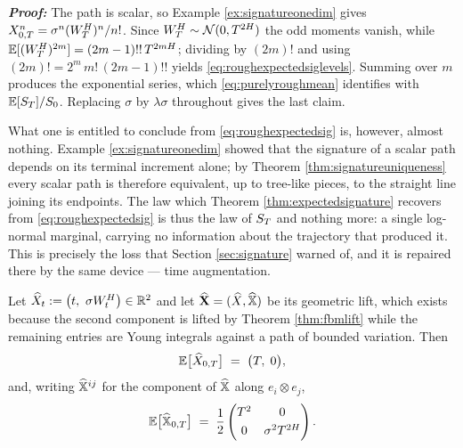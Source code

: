 \textbf{\textit{Proof:}} The path is scalar, so Example \ref{ex:signatureonedim} gives
$X^n_{0,T} = \sigma^n(W^{H}_T)^n/n!$. Since $W^{H}_T\sim\mathcal{N}(0,T^{2H})$ the odd
moments vanish, while $\mathbb{E}[(W^{H}_T)^{2m}] = (2m-1)!!\,T^{2mH}$; dividing by $(2m)!$ and
using $(2m)! = 2^m\,m!\,(2m-1)!!$ yields \eqref{eq:roughexpectedsiglevels}. Summing over $m$ produces
the exponential series, which \eqref{eq:purelyroughmean} identifies with
$\mathbb{E}[S_T]/S_0$. Replacing $\sigma$ by $\lambda\sigma$ throughout gives the last claim.
\qedfilledtext

\medskip

What one is entitled to conclude from \eqref{eq:roughexpectedsig} is, however, almost nothing. Example \ref{ex:signatureonedim} showed that the signature of a scalar
path depends on its terminal increment alone; by Theorem \ref{thm:signatureuniqueness} every scalar
path is therefore equivalent, up to tree-like pieces, to the straight line joining its endpoints. The
law which Theorem \ref{thm:expectedsignature} recovers from \eqref{eq:roughexpectedsig} is thus the
law of $S_T$ and nothing more: a single log-normal marginal, carrying no information about the
trajectory that produced it. This is precisely the loss that Section \ref{sec:signature} warned of,
and it is repaired there by the same device --- time augmentation.

\begin{proposition}\label{prop:roughexpectedsigaug}
Let $\widehat{X}_t := \bigl(t,\ \sigma W^{H}_t\bigr) \in \mathbb{R}^2$ and let
$\widehat{\mathbf{X}} = (\widehat X,\widehat{\mathbb{X}})$ be its geometric lift, which exists because the second
component is lifted by Theorem \ref{thm:fbmlift} while the remaining entries are Young integrals
against a path of bounded variation. Then
\begin{equation}\label{eq:augsiglevelone}
\mathbb{E}\bigl[\widehat X_{0,T}\bigr] \;=\; \bigl(T,\; 0\bigr),
\end{equation}
and, writing $\widehat{\mathbb{X}}^{ij}$ for the component of $\widehat{\mathbb{X}}$ along $e_i\otimes e_j$,
\begin{equation}\label{eq:augsigleveltwo}
\mathbb{E}\bigl[\widehat{\mathbb{X}}_{0,T}\bigr] \;=\; \frac12
\begin{pmatrix}
T^{2} & 0 \\[3pt]
0 & \sigma^2T^{2H}
\end{pmatrix}.
\end{equation}
\end{proposition}


